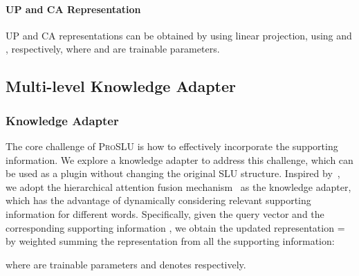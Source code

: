\documentclass[letterpaper]{article} \usepackage{aaai22}  \usepackage{times}  \usepackage{helvet}  \usepackage{courier}  \usepackage[hyphens]{url}  \usepackage{graphicx} \urlstyle{rm} \def\UrlFont{\rm}  \usepackage{natbib}  \usepackage{caption} \DeclareCaptionStyle{ruled}{labelfont=normalfont,labelsep=colon,strut=off} \frenchspacing  \setlength{\pdfpagewidth}{8.5in}  \setlength{\pdfpageheight}{11in}  \usepackage{algorithm}
\begin{document}
\paragraph{UP and CA Representation}
UP and CA representations can be obtained by using linear projection, using  and , respectively, where  and  are trainable parameters.

\subsection{Multi-level Knowledge Adapter}
\label{sec:knowledge_adapter}
\subsubsection{Knowledge Adapter}
The core challenge of \textsc{ProSLU} is how to effectively incorporate the supporting information.
We explore a knowledge adapter to address this challenge, which can be used as a plugin without changing the original SLU structure. 
Inspired by~\citet{Srinivasan2020MultimodalSR}, we adopt the hierarchical attention fusion mechanism~\citep{luong-etal-2015-effective, libovicky-helcl-2017-attention} as the knowledge adapter, which has the advantage of dynamically considering relevant supporting information for different words.
Specifically, given the query vector  and the corresponding supporting information , we obtain the updated representation  =  by weighted summing the representation from all the supporting information:

where  are trainable parameters and  denotes  respectively.
\end{document}
